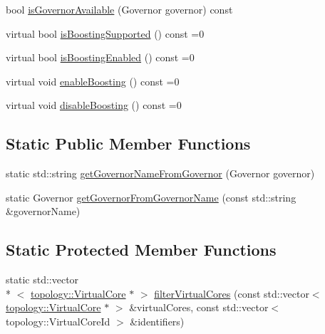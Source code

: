 \begin{DoxyCompactItemize}
\item 
bool \hyperlink{classmammut_1_1cpufreq_1_1CpuFreq_a1fb40924ebe83f5840d8586f71696fef}{is\-Governor\-Available} (Governor governor) const 
\item 
virtual bool \hyperlink{classmammut_1_1cpufreq_1_1CpuFreq_a93c7855b33a6794ddb8ba1aa0d4a5496}{is\-Boosting\-Supported} () const =0
\item 
virtual bool \hyperlink{classmammut_1_1cpufreq_1_1CpuFreq_acc8da4a88e11b5e974a4877e2ff1ef95}{is\-Boosting\-Enabled} () const =0
\item 
virtual void \hyperlink{classmammut_1_1cpufreq_1_1CpuFreq_a53f6662c7cf58861d562266c95a61e8c}{enable\-Boosting} () const =0
\item 
virtual void \hyperlink{classmammut_1_1cpufreq_1_1CpuFreq_a8abff63046f3b4ce5b992d4716fdabd1}{disable\-Boosting} () const =0
\end{DoxyCompactItemize}
\subsection*{Static Public Member Functions}
\begin{DoxyCompactItemize}
\item 
static std\-::string \hyperlink{classmammut_1_1cpufreq_1_1CpuFreq_a5939ceaaa900f083efee26b7c4fb4732}{get\-Governor\-Name\-From\-Governor} (Governor governor)
\item 
static Governor \hyperlink{classmammut_1_1cpufreq_1_1CpuFreq_a9c86322811a02a3ffb3bce5cb31884d3}{get\-Governor\-From\-Governor\-Name} (const std\-::string \&governor\-Name)
\end{DoxyCompactItemize}
\subsection*{Static Protected Member Functions}
\begin{DoxyCompactItemize}
\item 
static std\-::vector\\*
$<$ \hyperlink{classmammut_1_1topology_1_1VirtualCore}{topology\-::\-Virtual\-Core} $\ast$ $>$ \hyperlink{classmammut_1_1cpufreq_1_1CpuFreq_a62795ed1740117dcee4485d56ad39991}{filter\-Virtual\-Cores} (const std\-::vector$<$ \hyperlink{classmammut_1_1topology_1_1VirtualCore}{topology\-::\-Virtual\-Core} $\ast$ $>$ \&virtual\-Cores, const std\-::vector$<$ topology\-::\-Virtual\-Core\-Id $>$ \&identifiers)
\end{DoxyCompactItemize}


